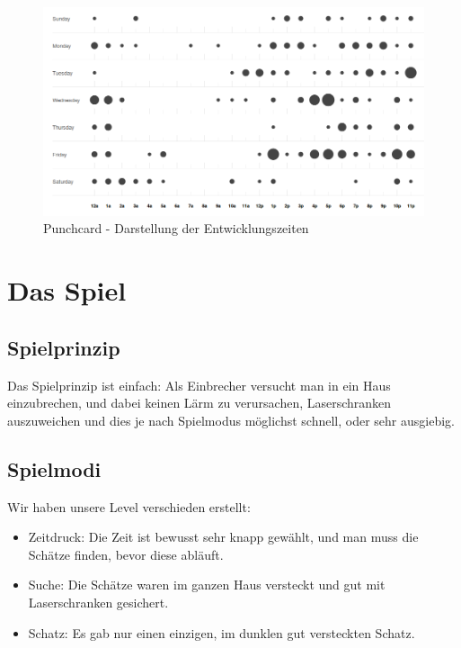 \documentclass[11pt,a4paper]{scrbook}
\begin{document}
\begin{figure}[h]
\centering
\includegraphics[scale=0.4]{img/punchcard.png}
\caption{Punchcard - Darstellung der Entwicklungszeiten}
\label{fig:punchcard}
\end{figure}

\chapter{Das Spiel}
\section{Spielprinzip}
Das Spielprinzip ist einfach: Als Einbrecher versucht man in ein Haus einzubrechen, und dabei keinen Lärm zu verursachen, Laserschranken auszuweichen
und dies je nach Spielmodus möglichst schnell, oder sehr ausgiebig.

\section{Spielmodi}
Wir haben unsere Level verschieden erstellt:
\begin{itemize}
\item Zeitdruck: Die Zeit ist bewusst sehr knapp gewählt, und man muss die Schätze finden, bevor diese abläuft.
\item Suche: Die Schätze waren im ganzen Haus versteckt und gut mit Laserschranken gesichert.
\item Schatz: Es gab nur einen einzigen, im dunklen gut versteckten Schatz.
\end{itemize}

\end{document}
